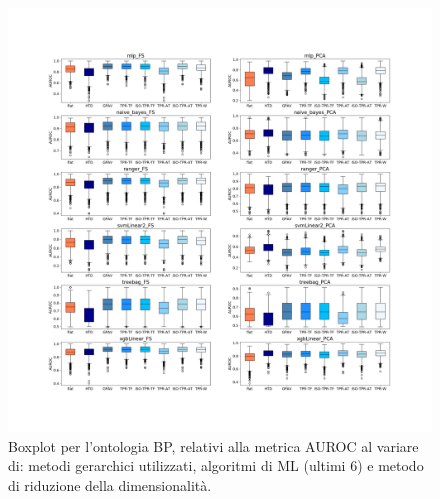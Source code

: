 \documentclass[12pt]{report}
\begin{document}
\begin{appendices}
\begin{figure}[h]
 \hspace*{-2.6cm}
\includegraphics[scale=0.34]{./images/BP_AUC_2.png}
\caption{\footnotesize{Boxplot per l'ontologia BP, relativi alla metrica AUROC al variare di: metodi gerarchici utilizzati, algoritmi di ML (ultimi 6) e metodo di riduzione della dimensionalità.}}
\label{BP_AUC_2}
\end{figure}


\end{appendices}
\end{document}
